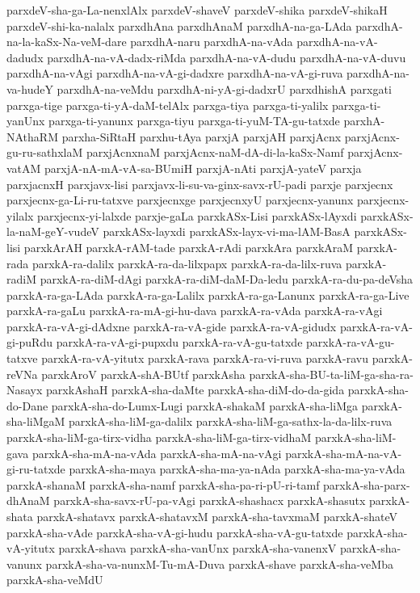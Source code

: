 {parxdeV-sha-ga-La-nenxlAlx
parxdeV-shaveV
parxdeV-shika
parxdeV-shikaH
parxdeV-shi-ka-nalalx
parxdhAna
parxdhAnaM
parxdhA-na-ga-LAda
parxdhA-na-la-kaSx-Na-veM-dare
parxdhA-naru
parxdhA-na-vAda
parxdhA-na-vA-dadudx
parxdhA-na-vA-dadx-riMda
parxdhA-na-vA-dudu
parxdhA-na-vA-duvu
parxdhA-na-vAgi
parxdhA-na-vA-gi-dadxre
parxdhA-na-vA-gi-ruva
parxdhA-na-va-hudeY
parxdhA-na-veMdu
parxdhA-ni-yA-gi-dadxrU
parxdhishA
parxgati
parxga-tige
parxga-ti-yA-daM-telAlx
parxga-tiya
parxga-ti-yalilx
parxga-ti-yanUnx
parxga-ti-yanunx
parxga-tiyu
parxga-ti-yuM-TA-gu-tatxde
parxhA-NAthaRM
parxha-SiRtaH
parxhu-tAya
parxjA
parxjAH
parxjAcnx
parxjAcnx-gu-ru-sathxlaM
parxjAcnxnaM
parxjAcnx-naM-dA-di-la-kaSx-Namf
parxjAcnx-vatAM
parxjA-nA-mA-vA-sa-BUmiH
parxjA-nAti
parxjA-yateV
parxja
parxjacnxH
parxjavx-lisi
parxjavx-li-su-va-ginx-savx-rU-padi
parxje
parxjecnx
parxjecnx-ga-Li-ru-tatxve
parxjecnxge
parxjecnxyU
parxjecnx-yanunx
parxjecnx-yilalx
parxjecnx-yi-lalxde
parxje-gaLa
parxkASx-Lisi
parxkASx-lAyxdi
parxkASx-la-naM-geY-vudeV
parxkASx-layxdi
parxkASx-layx-vi-ma-lAM-BasA
parxkASx-lisi
parxkArAH
parxkA-rAM-tade
parxkA-rAdi
parxkAra
parxkAraM
parxkA-rada
parxkA-ra-dalilx
parxkA-ra-da-lilxpapx
parxkA-ra-da-lilx-ruva
parxkA-radiM
parxkA-ra-diM-dAgi
parxkA-ra-diM-daM-Da-ledu
parxkA-ra-du-pa-deVsha
parxkA-ra-ga-LAda
parxkA-ra-ga-Lalilx
parxkA-ra-ga-Lanunx
parxkA-ra-ga-Live
parxkA-ra-gaLu
parxkA-ra-mA-gi-hu-dava
parxkA-ra-vAda
parxkA-ra-vAgi
parxkA-ra-vA-gi-dAdxne
parxkA-ra-vA-gide
parxkA-ra-vA-gidudx
parxkA-ra-vA-gi-puRdu
parxkA-ra-vA-gi-pupxdu
parxkA-ra-vA-gu-tatxde
parxkA-ra-vA-gu-tatxve
parxkA-ra-vA-yitutx
parxkA-rava
parxkA-ra-vi-ruva
parxkA-ravu
parxkA-reVNa
parxkAroV
parxkA-shA-BUtf
parxkAsha
parxkA-sha-BU-ta-liM-ga-sha-ra-Nasayx
parxkAshaH
parxkA-sha-daMte
parxkA-sha-diM-do-da-gida
parxkA-sha-do-Dane
parxkA-sha-do-Lumx-Lugi
parxkA-shakaM
parxkA-sha-liMga
parxkA-sha-liMgaM
parxkA-sha-liM-ga-dalilx
parxkA-sha-liM-ga-sathx-la-da-lilx-ruva
parxkA-sha-liM-ga-tirx-vidha
parxkA-sha-liM-ga-tirx-vidhaM
parxkA-sha-liM-gava
parxkA-sha-mA-na-vAda
parxkA-sha-mA-na-vAgi
parxkA-sha-mA-na-vA-gi-ru-tatxde
parxkA-sha-maya
parxkA-sha-ma-ya-nAda
parxkA-sha-ma-ya-vAda
parxkA-shanaM
parxkA-sha-namf
parxkA-sha-pa-ri-pU-ri-tamf
parxkA-sha-parx-dhAnaM
parxkA-sha-savx-rU-pa-vAgi
parxkA-shashacx
parxkA-shasutx
parxkA-shata
parxkA-shatavx
parxkA-shatavxM
parxkA-sha-tavxmaM
parxkA-shateV
parxkA-sha-vAde
parxkA-sha-vA-gi-hudu
parxkA-sha-vA-gu-tatxde
parxkA-sha-vA-yitutx
parxkA-shava
parxkA-sha-vanUnx
parxkA-sha-vanenxV
parxkA-sha-vanunx
parxkA-sha-va-nunxM-Tu-mA-Duva
parxkA-shave
parxkA-sha-veMba
parxkA-sha-veMdU
}
